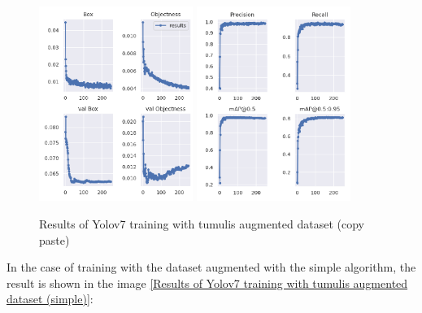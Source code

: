 \begin{figure}[H]
    \centering
    {{\includegraphics[width=5cm]{images/training/mamoas/aug1.png} }}
    \qquad
  {{\includegraphics[width=5cm]{images/training/mamoas/aug2.png} }}
    \caption{Results of Yolov7 training with tumulis augmented dataset (copy paste)}
    \label{Results of Yolov7 training with tumulis augmented dataset (copy paste)}
\end{figure}

In the case of training with the dataset augmented with the simple algorithm, the result is shown in the image \ref{Results of Yolov7 training with tumulis augmented dataset (simple)}:

